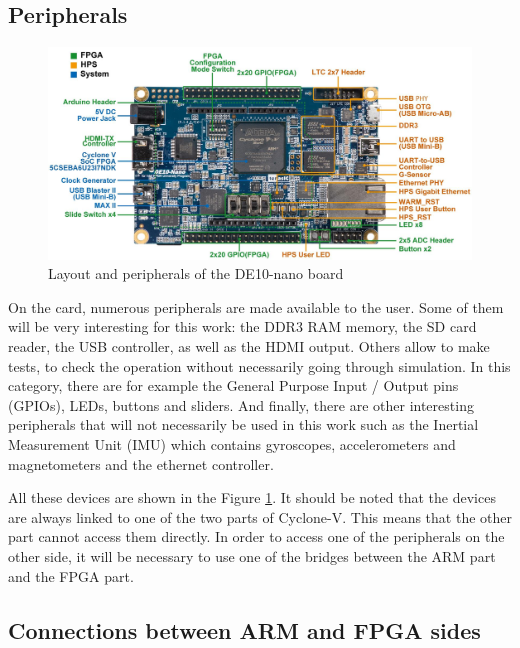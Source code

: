 \documentclass[12pt]{article}
\begin{document}
\subsection{Peripherals}

\begin{figure}[ht!]
  \center
  \includegraphics[width=12cm]{"res/chapter1/layout_components.png"}
  \caption{Layout and peripherals of the DE10-nano board}
  \label{fig:de10nano_peripherals}
\end{figure}

On the card, numerous peripherals are made available to the user. Some of them will be very interesting for this work: the DDR3 RAM memory, the SD card reader, the USB controller, as well as the HDMI output. Others allow to make tests, to check the operation without necessarily going through simulation. In this category, there are for example the General Purpose Input / Output pins (GPIOs), LEDs, buttons and sliders. And finally, there are other interesting peripherals that will not necessarily be used in this work such as the Inertial Measurement Unit (IMU) which contains gyroscopes, accelerometers and magnetometers and the ethernet controller.

\vspace{12pt}
All these devices are shown in the Figure \ref{fig:de10nano_peripherals}. It should be noted that the devices are always linked to one of the two parts of Cyclone-V. This means that the other part cannot access them directly. In order to access one of the peripherals on the other side, it will be necessary to use one of the bridges between the ARM part and the FPGA
part.

\subsection{Connections between ARM and FPGA sides}
\end{document}
